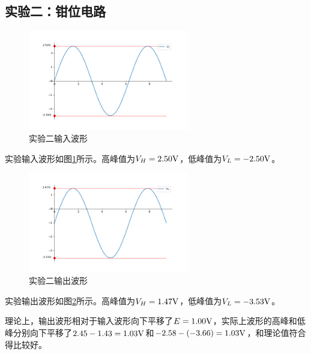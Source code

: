 \documentclass[a4paper,11pt,UTF8]{ctexart}
\begin{document}
	\subsection{实验二：钳位电路}
	\begin{figure}[H]
		\centering
		\includegraphics[width=7cm]{Ui.png}
		\caption{实验二输入波形}
		\label{fig:Exp2i}
	\end{figure}
	实验输入波形如图\ref{fig:Exp2i}所示。高峰值为$V_H=2.50\mathrm{V}$，低峰值为$V_L=-2.50\mathrm{V}$。
	\begin{figure}[H]
		\centering
		\includegraphics[width=7cm]{U4.png}
		\caption{实验二输出波形}
		\label{fig:Exp2o}
	\end{figure}
	实验输出波形如图\ref{fig:Exp2o}所示。高峰值为$V_H=1.47\mathrm{V}$，低峰值为$V_L=-3.53\mathrm{V}$。
	\par 理论上，输出波形相对于输入波形向下平移了$E=1.00\mathrm{V}$，实际上波形的高峰和低峰分别向下平移了$2.45-1.43=1.03\mathrm{V}$和$-2.58-(-3.66)=1.03\mathrm{V}$，和理论值符合得比较好。
\end{document}
